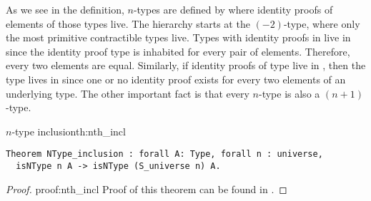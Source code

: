As we see in the definition, $n$-types are defined by where identity proofs of elements of those types live. The hierarchy starts at the $(-2)$-type, where only the most primitive contractible types live. Types with identity proofs in  live in  since the identity proof type is inhabited for every pair of elements. Therefore, every two elements are equal. Similarly, if identity proofs of type live in , then the type lives in  since one or no identity proof exists for every two elements of an underlying type. The other important fact is that every $n$-type is also a $(n+1)$-type.
\begin{theo}{$n$-type inclusion}{th:nth_incl}
\begin{verbatim}
Theorem NType_inclusion : forall A: Type, forall n : universe,
  isNType n A -> isNType (S_universe n) A.
\end{verbatim}
\end{theo}
\begin{proof}{}{proof:nth_incl}
Proof of this theorem can be found in .
\end{proof}
